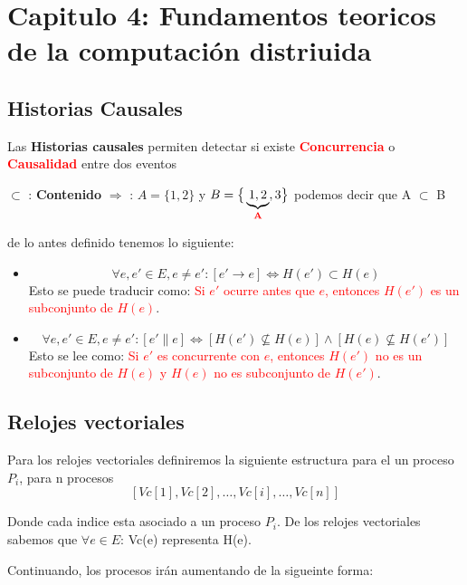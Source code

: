 \section{Capitulo 4: Fundamentos teoricos de la computación distriuida}
\subsection{Historias Causales}
Las \textbf{Historias causales} permiten detectar si existe \textcolor{red}{\textbf{Concurrencia}} o \textcolor{red}{\textbf{Causalidad}} entre dos eventos

\begin{center}
    $\subset$ : \textbf{Contenido} $\Rightarrow$ : $A=\{1,2\}$ y $B=\big\{\underbrace{1,2}_{\textcolor{red}{\textbf{A}}},3\big\}$ podemos decir que A $\subset$ B
\end{center}

de lo antes definido tenemos lo siguiente:

\begin{itemize}
    \item \[ \forall e, e' \in E, e \neq e' : [e' \rightarrow e] \Leftrightarrow H(e') \subset H(e) \]
    Esto se puede traducir como: \textcolor{red}{Si $e'$ ocurre antes que $e$, entonces $H(e')$ es un subconjunto de $H(e)$}.

    \item \[ \forall e, e' \in E, e \neq e' : [e' \parallel e] \Leftrightarrow [H(e') \nsubseteq H(e)] \land [H(e) \nsubseteq H(e')] \]
    Esto se lee como: \textcolor{red}{Si $e'$ es concurrente con $e$, entonces $H(e')$ no es un subconjunto de $H(e)$ y $H(e)$ no es subconjunto de $H(e')$}.
\end{itemize}

\subsection{Relojes vectoriales}
Para los relojes vectoriales definiremos la siguiente estructura para el un proceso $P_i$, para n procesos
\[
   \left[ \mathit{Vc}[1], \mathit{Vc}[2], \dots, \mathit{Vc}[i], \dots, \mathit{Vc}[n] \right]
\]

Donde cada indice esta asociado a un proceso $P_i$. De los relojes vectoriales sabemos que $\forall e \in E$: Vc(e) representa H(e).

Continuando, los procesos irán aumentando de la sigueinte forma:

